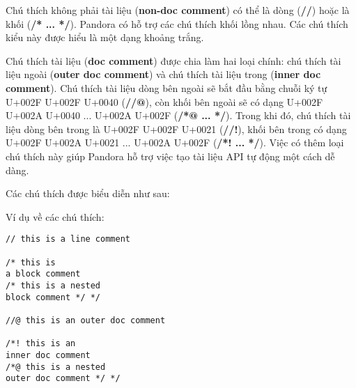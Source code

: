     Chú thích không phải tài liệu (\textbf{non-doc comment}) có thể là dòng (\textbf{//}) hoặc là khối (\textbf{/* ... */}). Pandora có hỗ trợ các chú thích khối lồng nhau. Các chú thích kiểu này được hiểu là một dạng khoảng trắng.

    Chú thích tài liệu (\textbf{doc comment}) được chia làm hai loại chính: chú thích tài liệu ngoài (\textbf{outer doc comment}) và chú thích tài liệu trong (\textbf{inner doc comment}). Chú thích tài liệu dòng bên ngoài sẽ bắt đầu bằng chuỗi ký tự U+002F U+002F U+0040 (\textbf{//@}), còn khối bên ngoài sẽ có dạng U+002F U+002A U+0040 ... U+002A U+002F (\textbf{/*@ ... */}). Trong khi đó, chú thích tài liệu dòng bên trong là U+002F U+002F U+0021 (\textbf{//!}), khối bên trong có dạng U+002F U+002A U+0021 ... U+002A U+002F (\textbf{/*! ... */}). Việc có thêm loại chú thích này giúp Pandora hỗ trợ việc tạo tài liệu API tự động một cách dễ dàng.

    Các chú thích được biểu diễn như sau:

    \regexlinecomment

    \regexblockcomment

    \regexdoc

\noindent Ví dụ về các chú thích:
\begin{lstlisting}[]
// this is a line comment

/* this is 
a block comment
/* this is a nested
block comment */ */

//@ this is an outer doc comment

/*! this is an 
inner doc comment 
/*@ this is a nested 
outer doc comment */ */
\end{lstlisting}

